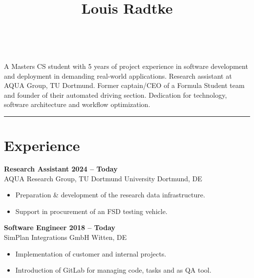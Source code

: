 \documentclass[a4paper,11pt]{article}
\newcommand{\subsectionskip}[0]{\vspace{0.125cm}}
\newcommand{\col}[2]{\textcolor[HTML]{#1}{#2}}
\begin{document}
\hfill
\begin{minipage}[t]{0.65\textwidth}
    \vspace{0cm} %
    \begin{center}
        \title*{\Huge \textbf{Louis Radtke}}\\
    \end{center}

    \vspace{0.125cm}

    {
        \small A Masters CS student with 5 years of project experience in software de\-velopment and deployment in demanding real-world applications. Research assistant at AQUA Group, TU Dortmund. Former captain/CEO of a Formula Student team and founder of their automated driving section. De\-dication for technology, software architecture and workflow optimization.
    }


    \vspace{0.25cm}
    \hrule

    \section*{\col{b1784a}{Experience}}
    \col{b57e53}{\textbf{Research Assistant \hfill 2024 -- Today}}\\
    AQUA Research Group, TU Dortmund University \hfill Dortmund, DE
    \begin{itemize}
        \small
        \item Preparation \& development of the research data infrastructure.
        \item Support in procurement of an FSD testing vehicle.
    \end{itemize}

    \subsectionskip

    \col{ae7c58}{\textbf{Software Engineer \hfill 2018 -- Today}} \\
    SimPlan Integrations GmbH \hfill Witten, DE
    \begin{itemize}
        \small
        \item Implementation of customer and internal projects.
        \item Introduction of GitLab for managing code, tasks and as QA tool.
    \end{itemize}


\end{minipage}
\end{document}
